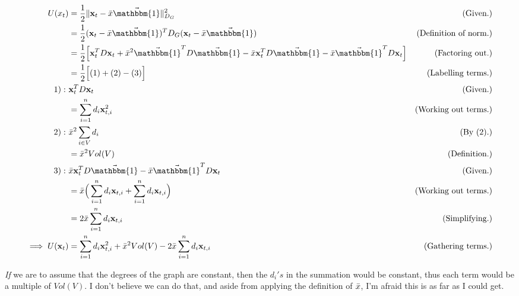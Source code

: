 \documentclass[10pt]{article}
\newcommand{\1}{\vec{\mathbbm{1}}}
\begin{document}
{{\begin{enumerate}[(a)]
    \begin{align}
        U(x_t) &= \frac{1}{2} \lVert \textbf{x}_t - \Bar{x}\1\rVert ^2_{D_G} &\text{(Given.)}\nonumber\\
        &= \frac{1}{2} (\textbf{x}_t - \Bar{x}\1)^TD_G(\textbf{x}_t - \Bar{x}\1) &\text{(Definition of norm.)}\nonumber\\
        &= \frac{1}{2} \Big[ \textbf{x}_t^TD\textbf{x}_t + \Bar{x}^2 \1^T D\1 - \Bar{x}\textbf{x}_t^TD\1 - \Bar{x} \1^TD\textbf{x}_t\Big] &\text{(Factoring out.)}\nonumber\\
        &= \frac{1}{2}\Big[ (1) + (2) - (3)\Big] &\text{(Labelling terms.)}\nonumber\\
        1): \ &\textbf{x}_t^T D \textbf{x}_t &\text{(Given.)}\nonumber\\
        &= \sum_{i = 1}^nd_i \textbf{x}_{t, i}^2 &\text{(Working out terms.)}\nonumber\\
        2): \ &\Bar{x}^2 \sum_{i \in V} d_i &\text{(By (2).)}\nonumber\\
        &= \Bar{x}^2 Vol(V) &\text{(Definition.)}\nonumber\\
        3): \ &\Bar{x}\textbf{x}_t^TD\1 - \Bar{x} \1^TD\textbf{x}_t &\text{(Given.)}\nonumber\\
        &= \Bar{x}\Big( \sum_{i = 1}^n d_i \textbf{x}_{t, i} + \sum_{i = 1}^n d_i \textbf{x}_{t, i}\Big) &\text{(Working out terms.)}\nonumber\\
        &= 2\Bar{x}\sum_{i = 1}^n d_i \textbf{x}_{t, i} &\text{(Simplifying.)}\nonumber\\
        \implies U(\textbf{x}_t) &= \sum_{i = 1}^nd_i \textbf{x}_{t, i}^2 + \Bar{x}^2 Vol(V) - 2\Bar{x}\sum_{i = 1}^n d_i \textbf{x}_{t, i} &\text{(Gathering terms.)}\nonumber
    \end{align}

    \textit{If} we are to assume that the degrees of the graph are constant, then the $d_i's$ in the summation would be constant, thus each term would be a multiple of $Vol(V)$. I don't believe we can do that, and aside from applying the definition of $\Bar{x}$, I'm afraid this is as far as I could get. 

\end{enumerate}
}

}
\newpage
\end{document}
